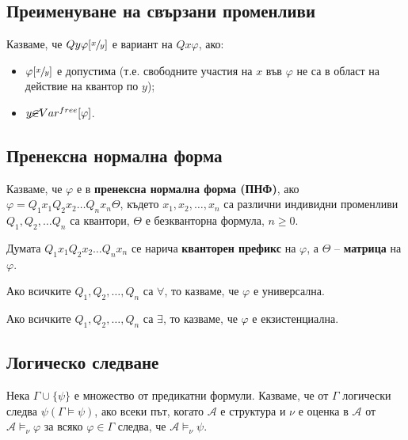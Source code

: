 \documentclass{article}
\begin{document}
\subsection*{Преименуване на свързани променливи}
\begin{mydef}[Вариант]
Казваме, че $Qy\varphi[\sfrac{x}{y}]$ е вариант на $Qx\varphi$, ако:
\begin{itemize}
\item $\varphi[\sfrac{x}{y}]$ е допустима (т.е. свободните участия на $x$ във $\varphi$ не са в област на действие на квантор по $y$);
\item $y \cancel{\in} Var^{free}[\varphi]$.
\end{itemize}
\end{mydef}

\subsection*{Пренексна нормална форма}

\begin{mydef}
Казваме, че $\varphi$ е в \textbf{пренексна нормална форма (ПНФ)}, ако $\varphi = Q_1x_1Q_2x_2\ldots Q_nx_n\Theta$, където $x_1, x_2, \ldots, x_n$ са различни индивидни променливи $Q_1, Q_2, \ldots Q_n$ са квантори, $\Theta$ е безкванторна формула, $n \geq 0$.

Думата $Q_1x_1Q_2x_2\ldots Q_nx_n$ се нарича \textbf{кванторен префикс} на $\varphi$, а $\Theta$ -- \textbf{матрица} на $\varphi$.

Ако всичките $Q_1, Q_2, \ldots, Q_n$ са $\forall$, то казваме, че $\varphi$ е универсална.

Ако всичките $Q_1, Q_2, \ldots, Q_n$ са $\exists$, то казваме, че $\varphi$ е екзистенциална.
\end{mydef}

\subsection*{Логическо следване}

\begin{mydef}
Нека $\Gamma\cup\{\psi\}$ е множество от предикатни формули. Казваме, че от $\Gamma$ логически следва $\psi (\Gamma \models \psi)$, ако всеки път, когато $\mathcal{A}$ е структура и $\nu$ е оценка в $\mathcal{A}$ от $\mathcal{A} \models_\nu \varphi$ за всяко $\varphi \in \Gamma$ следва, че $\mathcal{A} \models_\nu \psi$.
\end{mydef}
\end{document}
